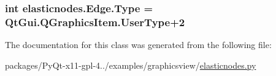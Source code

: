 \subsubsection[{Type}]{\setlength{\rightskip}{0pt plus 5cm}int elasticnodes.\+Edge.\+Type = Qt\+Gui.\+Q\+Graphics\+Item.\+User\+Type+2\hspace{0.3cm}{\ttfamily [static]}}\label{classelasticnodes_1_1Edge_aa6b1c2f8c79718061b0494cfc0ce10d8}


The documentation for this class was generated from the following file\+:\begin{DoxyCompactItemize}
\item 
packages/\+Py\+Qt-\/x11-\/gpl-\/4../examples/graphicsview/\hyperlink{elasticnodes_8py}{elasticnodes.\+py}\end{DoxyCompactItemize}
